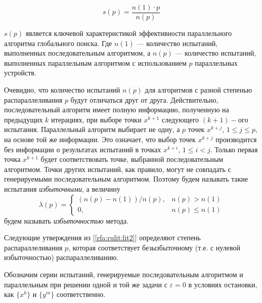 \documentclass[10pt,a4paper]{book}
\begin{document}
\begin{equation} \label{par_trl_ref}
s(p) = \frac{n(1) \cdot p}{n(p)}
\end{equation}

$s(p)$ является ключевой характеристикой эффективности параллельного алгоритма глобального поиска. Где $n(1)$ — количество испытаний, выполненных последовательным алгоритмом, а $n(p)$ — количество испытаний, выполненных параллельным алгоритмом с использованием $p$ параллельных устройств.

Очевидно, что количество испытаний $n(p)$ для алгоритмов с разной степенью распараллеливания $p$ будут отличаться друг от друга. Действительно, последовательный алгоритм имеет полную информацию, полученную на предыдущих $k$ итерациях, при выборе точки $x^{k+1}$ следующего $(k+1)-ого$ испытания. Параллельный алгоритм выбирает не одну, а $p$ точек $x^{k+j}$, $1 \leq j \leq p,$ на основе той же информации. Это означает, что выбор точек $x^{k+j}$ производится без информации о результатах испытаний в точках $x^{k+i}$, $1 \leq i < j$. Только первая точка $x^{k+1}$ будет соответствовать точке, выбранной последовательным алгоритмом. Точки других испытаний, как правило, могут не совпадать с генерируемыми последовательным алгоритмом. Поэтому будем называть такие испытания \textit{избыточными}, а величину
\begin{displaymath}
\lambda(p) = \left\{ \begin{array}{ll}
                (n(p) - n(1)) / n(p), & \textrm{$n(p) > n(1)$}\\
                0, & \textrm{$n(p) \leq n(1)$}
  \end{array} \right.
\end{displaymath}
будем называть \textit{избыточностью} метода.

Следующие утверждения из [\ref{rfa:rulit:lit2}] определяют степень распараллеливания $p$, которая соответствует безызбыточному (т.е. с нулевой избыточностью) распараллеливанию.

Обозначим серии испытаний, генерируемые последовательным алгоритмом и параллельным при решении одной и той же задачи с $\varepsilon=0$ в условиях остановки, как $\{x^k\}$ и $\{y^m \}$ соответственно.
\end{document}
